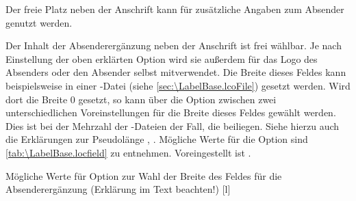 \iffalse%
Insbesondere bei Geschäftsbriefen reicht der Platz im Briefkopf und im
Seitenfuß oftmals nicht aus, um alle Angaben des Absenders unterzubringen. Für
die zusätzlichen Informationen kann der Platz neben der Anschrift
genutzt werden. In dieser Anleitung wird dieses Feld \emph{Absenderergänzung}
genannt.%
\else%
\iffalse%
Reicht der Raum in Briefkopf und Seitenfuß nicht aus, um alle Angaben zum
Absender unterzubringen, kann der Platz neben der Anschrift als
\emph{Absenderergänzung} genutzt werden.%
\else%
Der freie Platz neben der Anschrift kann für zusätzliche Angaben zum Absender
genutzt werden.%
\fi%
\fi

\begin{Declaration}
\end{Declaration}
%
Der Inhalt der Absenderergänzung neben der Anschrift ist frei wählbar.
Je nach Einstellung der
oben erklärten Option  wird sie außerdem
für das Logo des Absenders oder den Absender selbst mitverwendet. Die Breite
dieses Feldes kann beispielsweise in einer -Datei (siehe
\autoref{sec:\LabelBase.lcoFile}) gesetzt werden. Wird dort die Breite 0
gesetzt, so kann über die Option  zwischen zwei
unterschiedlichen Voreinstellungen für die Breite dieses Feldes gewählt
werden. Dies ist bei der Mehrzahl der -Dateien der Fall, die
\KOMAScript{} beiliegen. Siehe hierzu auch die Erklärungen zur Pseudolänge
,
. Mögliche Werte für die Option
sind \autoref{tab:\LabelBase.locfield} zu
entnehmen. Voreingestellt ist .
%
\begin{table}
  \setcapindent{0pt}%
  \begin{captionbeside}
    {Mögliche Werte für Option  zur Wahl der Breite des
      Feldes für die Absenderergänzung (Erklärung im Text beachten!)%
      \label{tab:\LabelBase.locfield}}%
    [l]
    \begin{minipage}[t]{.58\linewidth}
      \begin{desctabular}[t]
      \end{desctabular}
    \end{minipage}
  \end{captionbeside}
\end{table}


